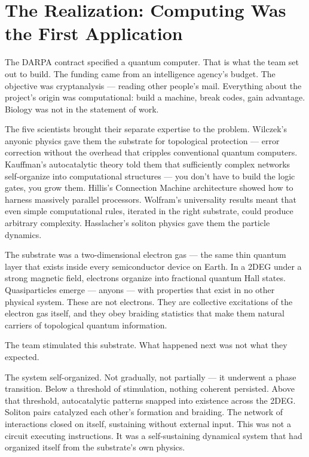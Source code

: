 
\section*{The Realization: Computing Was the First Application}

The DARPA contract specified a quantum computer. That is what the team set out to build. The funding came from an intelligence agency's budget. The objective was cryptanalysis --- reading other people's mail. Everything about the project's origin was computational: build a machine, break codes, gain advantage. Biology was not in the statement of work.

The five scientists brought their separate expertise to the problem. Wilczek's anyonic physics gave them the substrate for topological protection --- error correction without the overhead that cripples conventional quantum computers. Kauffman's autocatalytic theory told them that sufficiently complex networks self-organize into computational structures --- you don't have to build the logic gates, you grow them. Hillis's Connection Machine architecture showed how to harness massively parallel processors. Wolfram's universality results meant that even simple computational rules, iterated in the right substrate, could produce arbitrary complexity. Hasslacher's soliton physics gave them the particle dynamics.

The substrate was a two-dimensional electron gas --- the same thin quantum layer that exists inside every semiconductor device on Earth. In a 2DEG under a strong magnetic field, electrons organize into fractional quantum Hall states. Quasiparticles emerge --- anyons --- with properties that exist in no other physical system. These are not electrons. They are collective excitations of the electron gas itself, and they obey braiding statistics that make them natural carriers of topological quantum information.

The team stimulated this substrate. What happened next was not what they expected.

The system self-organized. Not gradually, not partially --- it underwent a phase transition. Below a threshold of stimulation, nothing coherent persisted. Above that threshold, autocatalytic patterns snapped into existence across the 2DEG. Soliton pairs catalyzed each other's formation and braiding. The network of interactions closed on itself, sustaining without external input. This was not a circuit executing instructions. It was a self-sustaining dynamical system that had organized itself from the substrate's own physics.

